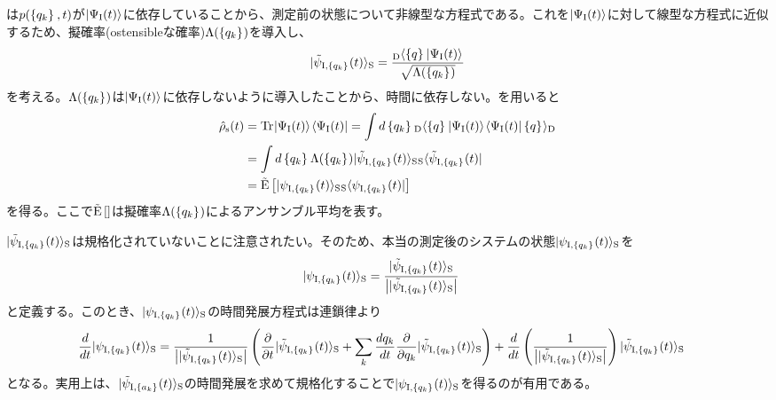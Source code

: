 \documentclass[10pt, a4paper]{jsarticle}
\begin{document}
は$p(\left\{ q_{k} \right\}_{}, t)$が$| \Psi_{\rm I}(t) \rangle_{\rm }$に依存していることから、測定前の状態について非線型な方程式である。これを$| \Psi_{\rm I}(t) \rangle_{\rm }$に対して線型な方程式に近似するため、擬確率(ostensibleな確率)$\Lambda (\left\{ q_{k} \right\}_{})$を導入し、
\begin{equation}
\begin{split}
\label{eq:215}
	\ket{\tilde{\psi}_{{\rm I}, \set{q_{k}}{}}(t)}{S} &= \dfrac{\inner{\set{q}{}}{D}{\Psi_{\rm I}(t)}{}}{\sqrt{\Lambda (\set{q_{k}}{})}} \\
\end{split}
\end{equation}
を考える。$\Lambda (\left\{ q_{k} \right\}_{})$は$| \Psi_{\rm I}(t) \rangle_{\rm }$に依存しないように導入したことから、時間に依存しない。を用いると
\begin{equation}
\begin{split}
\label{eq:216}
	\hrho{s}(t) &= \Tr{}{\ket{\Psi_{\rm I}(t)}{} \bra{\Psi_{\rm I}(t)}{}} = \int{}{} d\set{q_{k}}{} \inner{\set{q}{}}{D}{\Psi_{\rm I}(t)}{} \inner{\Psi_{\rm I}(t)}{}{\set{q}{}}{D} \\&= \int{}{} d\set{q_{k}}{} \Lambda (\set{q_{k}}{}) \ket{\tilde{\psi}_{{\rm I}, \set{q_{k}}{}}(t)}{S} \bra{\tilde{\psi}_{{\rm I}, \set{q_{k}}{}}(t)}{S} \\
		&= \tildeensemble{\ket{\psi_{{\rm I}, \set{q_{k}}{}}(t)}{S} \bra{\psi_{{\rm I}, \set{q_{k}}{}}(t)}{S}}
\end{split}
\end{equation}
を得る。ここで${\rm \tilde{E}} \left[  \right]$は擬確率$\Lambda (\left\{ q_{k} \right\}_{})$によるアンサンブル平均を表す。


$| \tilde{\psi}_{{\rm I}, \left\{ q_{k} \right\}_{}}(t) \rangle_{\rm S}$は規格化されていないことに注意されたい。そのため、本当の測定後のシステムの状態$| \psi_{{\rm I}, \left\{ q_{k} \right\}_{}}(t) \rangle_{\rm S}$を
\begin{equation}
\begin{split}
\label{eq:217}
	\ket{\psi_{{\rm I}, \set{q_{k}}{}}(t)}{S} &= \dfrac{\ket{\tilde{\psi}_{{\rm I}, \set{q_{k}}{}}(t)}{S}}{\norm{\ket{\tilde{\psi}_{{\rm I}, \set{q_{k}}{}}(t)}{S}}}
\end{split}
\end{equation}
と定義する。このとき、$| \psi_{{\rm I}, \left\{ q_{k} \right\}_{}}(t) \rangle_{\rm S}$の時間発展方程式は連鎖律より
\begin{equation}
\begin{split}
\label{eq:218}
	\dev{}{t}\ket{\psi_{{\rm I}, \set{q_{k}}{}}(t)}{S} &= \dfrac{1}{\norm{\ket{\tilde{\psi}_{{\rm I}, \set{q_{k}}{}}(t)}{S}}} \left( \pdev{}{t}\ket{\tilde{\psi}_{{\rm I}, \set{q_{k}}{}}(t)}{S} + \sum_{k} \dev{q_{k}}{t} \pdev{}{q_{k}}\ket{\tilde{\psi}_{{\rm I}, \set{q_{k}}{}}(t)}{S} \right) + \dev{}{t} \left( \dfrac{1}{\norm{\ket{\tilde{\psi}_{{\rm I}, \set{q_{k}}{}}(t)}{S}}} \right) \ket{\tilde{\psi}_{{\rm I}, \set{q_{k}}{}}(t)}{S}
\end{split}
\end{equation}
となる。実用上は、$| \tilde{\psi}_{{\rm I}, \left\{ a_{k} \right\}_{}}(t) \rangle_{\rm S}$の時間発展を求めて規格化することで$| \psi_{{\rm I}, \left\{ q_{k} \right\}_{}}(t) \rangle_{\rm S}$を得るのが有用である。
\end{document}
